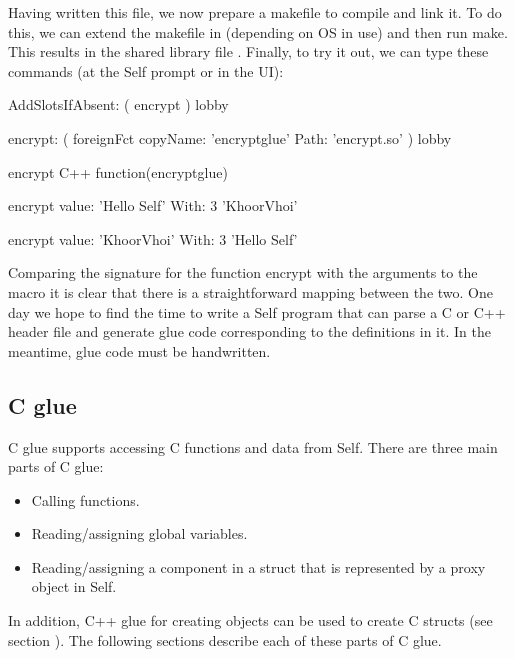 \documentclass[letterpaper,10pt,english]{sphinxmanual}
\begin{document}
Having written this file, we now prepare a makefile to compile and link it. To do this, we can extend
the makefile in  (depending on OS in use) and then run make.
This results in the shared library file . Finally, to try it out, we can type these commands
(at the Self prompt or in the UI):

\begin{sphinxVerbatim}[commandchars=\\\{\}]
\PYGZgt{} \PYGZus{}AddSlotsIfAbsent: ( \textbar{} encrypt \textbar{} )
lobby

\PYGZgt{} encrypt: ( foreignFct copyName: ’encrypt\PYGZus{}glue’ Path: ’encrypt.so’ )
lobby

\PYGZgt{} encrypt
\PYGZlt{}C++ function(encrypt\PYGZus{}glue)\PYGZgt{}

\PYGZgt{} encrypt value: ’Hello Self’ With: 3
’Khoor\PYGZsh{}Vhoi’

\PYGZgt{} encrypt value: ’Khoor\PYGZsh{}Vhoi’ With: \PYGZhy{}3
’Hello Self’
\end{sphinxVerbatim}

Comparing the signature for the function encrypt with the arguments to the  macro it
is clear that there is a straightforward mapping between the two. One day we hope to find the time
to write a Self program that can parse a C or C++ header file and generate glue code corresponding
to the definitions in it. In the meantime, glue code must be handwritten.


\subsection{C glue}
\label{\detokenize{vmref:c-glue}}\label{\detokenize{vmref:index-68}}
C glue supports accessing C functions and data from Self. There are three main parts of C glue:
\begin{itemize}
\item {} 
Calling functions.

\item {} 
Reading/assigning global variables.

\item {} 
Reading/assigning a component in a struct that is represented by a proxy object in Self.

\end{itemize}

In addition, C++ glue for creating objects can be used to create C structs (see section {\hyperref[\detokenize{vmref:id2}]{}}). The
following sections describe each of these parts of C glue.
\end{document}
